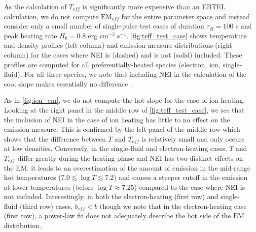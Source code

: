 \documentclass[apj]{emulateapj}
\begin{document}
	\par As the calculation of $T_{eff}$ is significantly more expensive than an EBTEL calculation, we do not compute $\mathrm{EM}_{eff}$ for the entire parameter space and instead consider only a small number of single-pulse test cases of duration $\tau_H=100$ s and peak heating rate $H_0=0.8$ erg cm$^{-3}$ s$^{-1}$. \autoref{fig:teff_test_case} shows temperature and density profiles (left column)  and emission measure distributions (right column) for the cases where NEI is (dashed) and is not (solid) included. These profiles are computed for all preferentially-heated species (electron, ion, single-fluid). For all three species, we note that including NEI in the calculation of the cool slope makes essentially no difference .
	\par As in \autoref{fig:ion_em}, we do not compute the hot slope for the case of ion heating. Looking at the right panel in the middle row of \autoref{fig:teff_test_case}, we see that the inclusion of NEI in the case of ion heating has little to no effect on the emission measure. This is confirmed by the left panel of the middle row which shows that the difference between $T$ and $T_{eff}$ is relatively small and only occurs at low densities. Conversely, in the single-fluid and electron-heating cases, $T$ and $T_{eff}$ differ greatly during the heating phase and NEI has two distinct effects on the $\mathrm{EM}$: it leads to an overestimation of the amount of emission in the mid-range hot temperatures ($7.0\lesssim\log{T}\lesssim7.2$) and causes a steeper cutoff in the emission at lower temperatures (before $\log{T}\approx7.25$) compared to the case where NEI is not included. Interestingly, in both the electron-heating (first row) and single-fluid (third row) cases, $b_{eff}<b$ though we note that in the electron-heating case (first row), a power-law fit does not adequately describe the hot side of the $\mathrm{EM}$ distribution.
\end{document}
